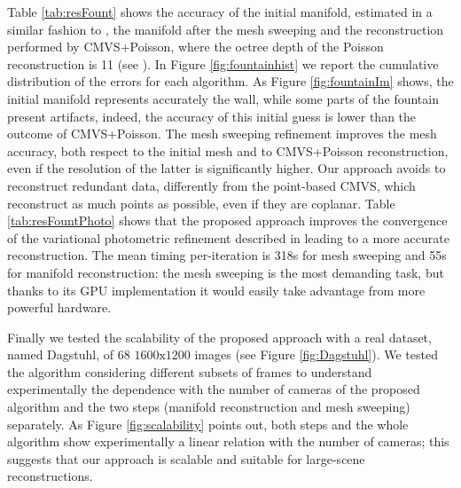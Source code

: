 Table \ref{tab:resFount} shows the accuracy of the initial manifold, estimated in a similar fashion to \cite{romanoni15b}, the manifold after the mesh sweeping and the reconstruction performed by CMVS+Poisson, where the octree depth of the Poisson reconstruction is 11 (see \cite{kazhdan2006poisson}). 
In Figure \ref{fig:fountainhist} we report the cumulative distribution of the errors for each algorithm.
As Figure \ref{fig:fountainIm} shows, the initial manifold represents accurately the wall, while some parts of the fountain present artifacts, indeed, the accuracy of this initial guess is lower than the outcome of CMVS+Poisson.
The mesh sweeping refinement improves the mesh accuracy, both respect to the initial mesh and to CMVS+Poisson reconstruction, even if the resolution of the latter is significantly higher. Our approach avoids to reconstruct redundant data, differently from the point-based CMVS, which reconstruct as much points as possible, even if they are coplanar.
Table \ref{tab:resFountPhoto} shows that the proposed approach improves the convergence of the variational photometric refinement described in \cite{vu_et_al_2012} leading to a more accurate reconstruction. 
The mean timing per-iteration is 318s for mesh sweeping and 55s for manifold reconstruction: the mesh sweeping is the most demanding task, but thanks to its GPU implementation it would easily take advantage from more powerful hardware.

Finally we tested the scalability of the proposed approach with a real dataset, named Dagstuhl, of 68 $1600\text{x}1200$ images (see Figure \ref{fig:Dagstuhl}). 
We tested the algorithm considering different subsets of frames to understand experimentally the dependence with the number of cameras of the proposed algorithm and the two steps (manifold reconstruction and mesh sweeping) separately. 
As Figure \ref{fig:scalability} points out, both steps and the whole algorithm show experimentally a linear relation with the number of cameras; this suggests that our approach is scalable and suitable for large-scene reconstructions.



